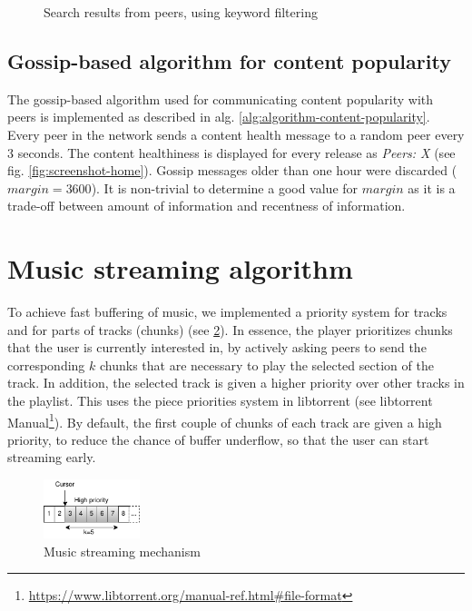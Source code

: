 \begin{figure}
        \caption{Search results from peers, using keyword filtering}
        \label{fig:search-3}
    \endminipage\hfill
\end{figure}

\subsection{Gossip-based algorithm for content popularity}
The gossip-based algorithm used for communicating content popularity with peers is implemented as described in alg. \ref{alg:algorithm-content-popularity}. Every peer in the network sends a content health message to a random peer every 3 seconds. The content healthiness is displayed for every release as \textit{Peers: X} (see fig. \ref{fig:screenshot-home}). Gossip messages older than one hour were discarded ($margin=3600$). It is non-trivial to determine a good value for $margin$ as it is a trade-off between amount of information and recentness of information. 

\section{Music streaming algorithm}
To achieve fast buffering of music, we implemented a priority system for tracks and for parts of tracks (chunks) (see \ref{fig:music-streaming-mechanism}). In essence, the player prioritizes chunks that the user is currently interested in, by actively asking peers to send the corresponding $k$ chunks that are necessary to play the selected section of the track. In addition, the selected track is given a higher priority over other tracks in the playlist. This uses the piece priorities system in libtorrent (see libtorrent Manual\footnote{\url{https://www.libtorrent.org/manual-ref.html\#file-format}}). By default, the first couple of chunks of each track are given a high priority, to reduce the chance of buffer underflow, so that the user can start streaming early. 
\begin{figure}
    \centering
    \includegraphics[width=0.25\textwidth]{implementation/streaming-algorithm.png}
    \caption{Music streaming mechanism}
    \label{fig:music-streaming-mechanism}
\end{figure}

